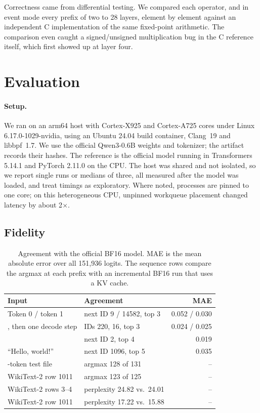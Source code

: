 \documentclass[sigconf,nonacm]{acmart}
\begin{document}
Correctness came from differential testing. We compared each operator, and in
event mode every prefix of two to 28 layers, element by element against an
independent C implementation of the same fixed-point arithmetic. The
comparison even caught a signed/unsigned multiplication bug in the C
reference itself, which first showed up at layer four.

\section{Evaluation}
\label{sec:eval}

\paragraph{Setup.} We ran on an arm64 host with Cortex-X925 and Cortex-A725
cores under Linux 6.17.0-1029-nvidia, using an Ubuntu 24.04 build container,
Clang~19 and libbpf~1.7. We use the official Qwen3-0.6B weights and
tokenizer; the artifact records their hashes. The reference is the official
model running in Transformers 5.14.1 and PyTorch 2.11.0 on the CPU. The host
was shared and not isolated, so we report single runs or medians of three,
all measured after the model was loaded, and treat timings as exploratory.
Where noted, processes are pinned to one core; on this heterogeneous CPU,
unpinned workqueue placement changed latency by about 2$\times$.

\subsection{Fidelity}

\begin{table}[t]
\centering
\small
\caption{Agreement with the official BF16 model. MAE is the mean absolute
error over all 151,936 logits. The sequence rows compare the argmax at each
prefix with an incremental BF16 run that uses a KV cache.}
\label{tab:fidelity}
\begin{tabular}{@{}>{\raggedright\arraybackslash}p{}>{\raggedright\arraybackslash}p{}r@{}}
\toprule
Input & Agreement & MAE \\
\midrule
Token 0 / token 1 & next ID 9 / 14582, top 3 & 0.052 / 0.030 \\
{[0, 1]}, then one decode step & IDs 220, 16, top 3 & 0.024 / 0.025 \\
{[0, 1, 2, 3]} & next ID 2, top 4 & 0.019 \\
``Hello, world!'' & next ID 1096, top 5 & 0.035 \\
\midrule
131-token test file & argmax 128 of 131 & -- \\
WikiText-2 row 1011 & argmax 123 of 125 & -- \\
\midrule
WikiText-2 rows 3--4 & perplexity 24.82 vs.\ 24.01 & -- \\
WikiText-2 row 1011 & perplexity 17.22 vs.\ 15.88 & -- \\
\bottomrule
\end{tabular}
\end{table}
\end{document}
